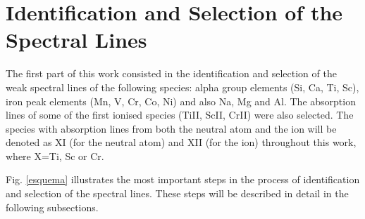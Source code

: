 \documentclass[dvips,12pt,a4paper]{report}
\begin{document}
{\section {Identification and Selection of the Spectral Lines}

The first part of this work consisted in the identification and selection of the weak spectral lines of the following species: alpha group elements (Si, Ca, Ti, Sc), iron peak elements (Mn, V, Cr, Co, Ni) and also Na, Mg and Al. The absorption lines of some of the first ionised species (TiII, ScII, CrII)  were also selected. The species with absorption lines from both the neutral atom and the ion will be denoted as XI (for the neutral atom) and XII (for the ion) throughout this work, where X=Ti, Sc or Cr.

Fig. \ref{esquema} illustrates the most important steps in the process of identification and selection of the spectral lines. These steps will be described in detail in the following subsections. %

}
\end{document}
